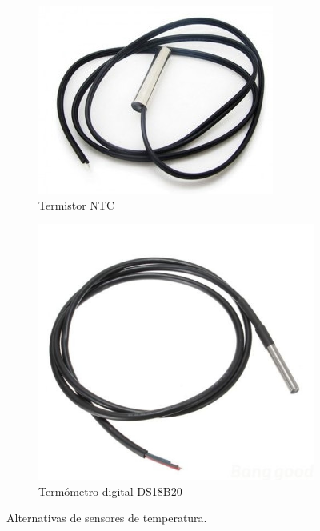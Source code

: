 \begin{figure}[h]
\centering
\begin{subfigure}{.5\textwidth}
  	\centering
  	\includegraphics[height=.15\textheight]{./Figures/sensor_temp_1}
	\caption{Termistor NTC\protect\footnotemark}
	\label{fig:temperatura1}
\end{subfigure}%
\begin{subfigure}{.5\textwidth}
	\centering
  	\includegraphics[height=.15\textheight]{./Figures/sensor_temp_2}
  	\caption[]{Termómetro digital DS18B20\protect\footnotemark}
  	\label{fig:temperatura2}
\end{subfigure}
\caption[Alternativas comerciales de sensores de temperatura.]{Alternativas de sensores de temperatura. }
\label{fig:sensoresTemp}
\end{figure}



